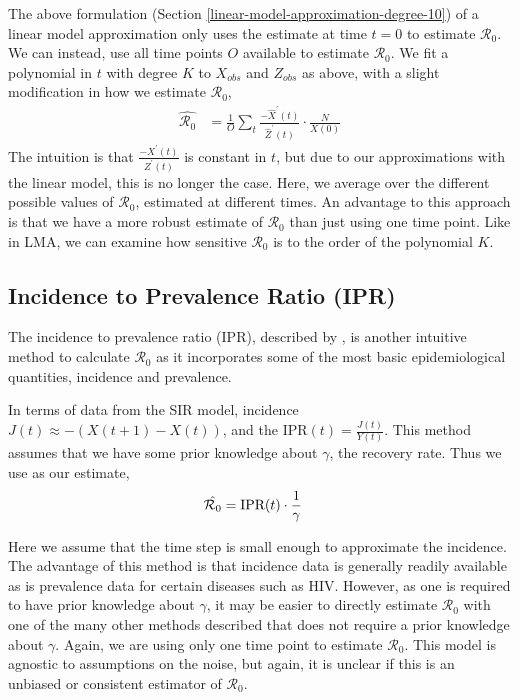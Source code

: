 \message{ !name(draft_v13.tex)}\documentclass[12pt]{article}
\newcommand{\rr}{\ensuremath{\mathcal{R}_0}}
\begin{document}
The above formulation (Section \ref{linear-model-approximation-degree-10}) of a linear model approximation only uses the estimate at time $t=0$ to estimate $\rr$.  We can instead, use all time points $O$ available to estimate $\rr$.  We fit a polynomial in \(t\) with degree \(K\) to \(X_{obs}\)
and \(Z_{obs}\) as above, with a slight modification in how we estimate
\(\rr\),
\begin{align*}
  \hat{\rr} &= \frac{1}{O} \sum_t \frac{-\hat{X}^\prime(t)}{\hat{Z}^\prime(t)} \cdot \frac{N}{X(0)} 
\end{align*}
The intuition is that $\frac{-X^\prime(t)}{Z^\prime(t)}$ is constant in $t$, but due to our approximations with the linear model, this is no longer the case.  Here, we average over the different possible values of $\rr$, estimated at different times.  An advantage to this approach is that we have a more robust estimate of $\rr$ than just using one time point.  Like in LMA, we can examine how sensitive $\rr$ is to the order of the polynomial $K$.


\subsection{Incidence to Prevalence Ratio (IPR)}\label{incidence-to-prevalence-ratio}
The incidence to prevalence ratio (IPR), described by \cite{Nishiura2009}, is another intuitive method to calculate $\rr$ as it incorporates some of the most basic epidemiological quantities, incidence and prevalence.

In terms of data from the SIR model, incidence $J(t) \approx -(X(t+1) - X(t))$, and the IPR$(t) = \frac{J(t)}{Y(t)}$.  This method assumes that we have some prior knowledge about $\gamma$, the recovery rate.  Thus we use as our estimate,
\begin{align*}
\hat{\rr} &= \textnormal{IPR}(t) \cdot \frac{1}{\gamma}
\end{align*}

Here we assume that the time step is small enough to approximate the incidence.  The advantage of this method is that incidence data is generally readily available as is prevalence data for certain diseases such as HIV.  However, as one is required to have prior knowledge about $\gamma$, it may be easier to directly estimate $\rr$ with one of the many other methods described that does not require a prior knowledge about $\gamma$.  Again, we are using only one time point to estimate $\rr$.  This model is agnostic to assumptions on the noise, but again, it is unclear if this is an unbiased or consistent estimator of $\rr$.
\end{document}
